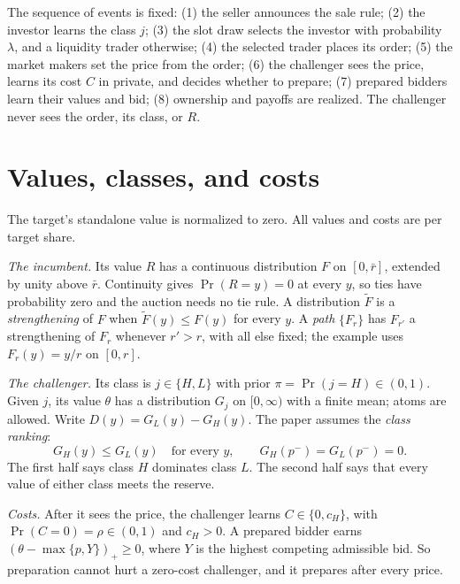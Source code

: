 The sequence of events is fixed:
(1) the seller announces the sale rule;
(2) the investor learns the class \(j\);
(3) the slot draw selects the investor with probability \(\lambda\), and a liquidity trader otherwise;
(4) the selected trader places its order;
(5) the market makers set the price from the order;
(6) the challenger sees the price, learns its cost \(C\) in private, and decides whether to prepare;
(7) prepared bidders learn their values and bid;
(8) ownership and payoffs are realized.
The challenger never sees the order, its class, or \(R\).

\section{Values, classes, and costs}\label{sec:model-values}

The target's standalone value is normalized to zero. All values and costs are per target share.

\emph{The incumbent.} Its value \(R\) has a continuous distribution \(F\) on \([0,\bar r]\), extended by unity above \(\bar r\).
Continuity gives \(\Pr(R=y)=0\) at every \(y\), so ties have probability zero and the auction needs no tie rule.
A distribution \(\tilde F\) is a \emph{strengthening} of \(F\) when \(\tilde F(y)\le F(y)\) for every \(y\).
A \emph{path} \(\{F_r\}\) has \(F_{r'}\) a strengthening of \(F_r\) whenever \(r'>r\), with all else fixed; the example uses \(F_r(y)=y/r\) on \([0,r]\).

\emph{The challenger.} Its class is \(j\in\{H,L\}\) with prior \(\pi=\Pr(j=H)\in(0,1)\).
Given \(j\), its value \(\theta\) has a distribution \(G_j\) on \([0,\infty)\) with a finite mean; atoms are allowed.
Write \(D(y)=G_L(y)-G_H(y)\). The paper assumes the \emph{class ranking}:
\begin{equation}\label{eq:model-classes}
G_H(y)\le G_L(y)\quad\text{for every }y,\qquad G_H(p^-)=G_L(p^-)=0.
\end{equation}
The first half says class \(H\) dominates class \(L\). The second half says that every value of either class meets the reserve.

\emph{Costs.} After it sees the price, the challenger learns \(C\in\{0,c_H\}\), with \(\Pr(C=0)=\rho\in(0,1)\) and \(c_H>0\).
A prepared bidder earns \((\theta-\max\{p,Y\})_+\ge0\), where \(Y\) is the highest competing admissible bid.
So preparation cannot hurt a zero-cost challenger, and it prepares after every price.

